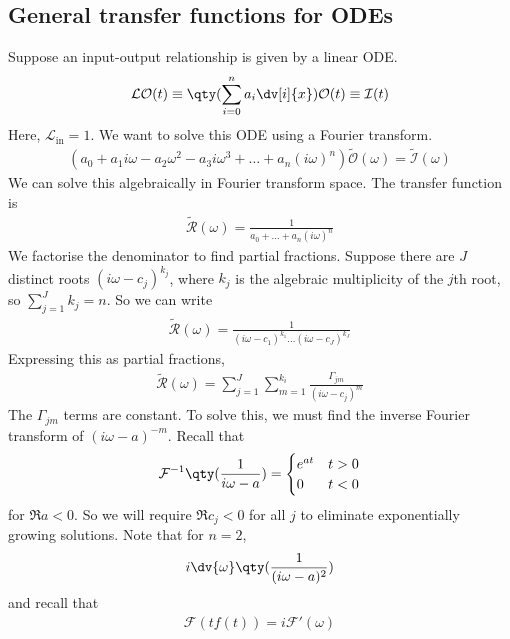 \subsection{General transfer functions for ODEs}
Suppose an input-output relationship is given by a linear ODE.\@
\begin{align*}
	\mathcal L \mathcal O(t) \equiv \qty(\sum_{i=0}^n a_i \dv[i]{x}) \mathcal O(t) \equiv \mathcal I(t)
\end{align*}
Here, $\mathcal L_{\text{in}} = 1$.
We want to solve this ODE using a Fourier transform.
\begin{align*}
	(a_0 + a_1 i\omega - a_2 \omega^2 - a_3 i\omega^3 + \dots + a_n (i \omega)^n) \widetilde{\mathcal O}(\omega) = \widetilde{\mathcal I}(\omega)
\end{align*}
We can solve this algebraically in Fourier transform space.
The transfer function is
\begin{align*}
	\widetilde{\mathcal R}(\omega) = \frac{1}{a_0 + \dots + a_n (i \omega)^n}
\end{align*}
We factorise the denominator to find partial fractions.
Suppose there are $J$ distinct roots $(i \omega - c_j)^{k_j}$, where $k_j$ is the algebraic multiplicity of the $j$th root, so $\sum_{j=1}^J k_j = n$.
So we can write
\begin{align*}
	\widetilde{\mathcal R}(\omega) = \frac{1}{(i \omega - c_1)^{k_1} \dots (i \omega - c_J)^{k_J}}
\end{align*}
Expressing this as partial fractions,
\begin{align*}
	\widetilde{\mathcal R}(\omega) = \sum_{j=1}^J \sum_{m=1}^{k_i} \frac{\Gamma_{jm}}{(i\omega - c_j)^m}
\end{align*}
The $\Gamma_{jm}$ terms are constant.
To solve this, we must find the inverse Fourier transform of $(i\omega - a)^{-m}$.
Recall that
\begin{align*}
	\mathcal F\inv\qty(\frac{1}{i\omega - a}) = \begin{cases}
		e^{at} & t > 0 \\
		0      & t < 0
	\end{cases}
\end{align*}
for $\Re a < 0$.
So we will require $\Re c_j < 0$ for all $j$ to eliminate exponentially growing solutions.
Note that for $n = 2$,
\begin{align*}
	i \dv{\omega} \qty(\frac{1}{(i \omega - a)^2})
\end{align*}
and recall that
\begin{align*}
	\mathcal F (t f(t)) = i \mathcal F'(\omega)
\end{align*}
